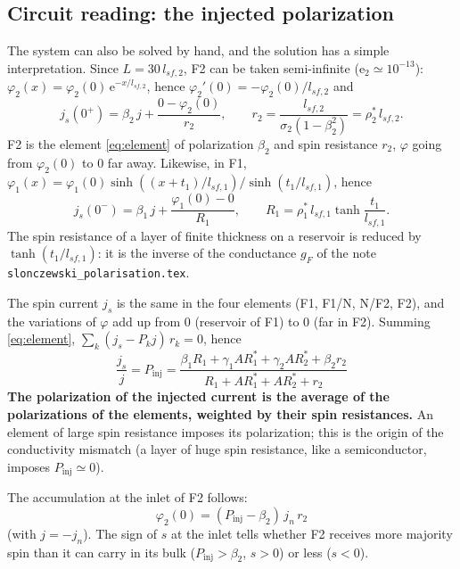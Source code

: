 \documentclass[11pt,a4paper]{article}
\newcommand{\ee}{\mathrm{e}}
\begin{document}
\subsection{Circuit reading: the injected polarization}
\label{sec:circuit}

The system can also be solved by hand, and the solution has a simple
interpretation. Since $L = 30\,l_{sf,2}$, F2 can be taken semi-infinite
($\ee_2 \simeq 10^{-13}$): $\varphi_2(x) = \varphi_2(0)\,\ee^{-x/l_{sf,2}}$,
hence $\varphi_2'(0) = -\varphi_2(0)/l_{sf,2}$ and
\begin{equation}
  j_s(0^+) = \beta_2\,j + \frac{0-\varphi_2(0)}{r_2},
  \qquad r_2 = \frac{l_{sf,2}}{\sigma_2(1-\beta_2^2)} = \rho_2^*\,l_{sf,2} .
\end{equation}
F2 is the element \eqref{eq:element} of polarization $\beta_2$ and spin
resistance $r_2$, $\varphi$ going from $\varphi_2(0)$ to 0 far away.
Likewise, in F1, $\varphi_1(x) = \varphi_1(0)\sinh\left((x+t_1)/l_{sf,1}\right)/
\sinh(t_1/l_{sf,1})$, hence
\begin{equation}
  j_s(0^-) = \beta_1\,j + \frac{\varphi_1(0)-0}{R_1},
  \qquad R_1 = \rho_1^*\,l_{sf,1}\tanh\frac{t_1}{l_{sf,1}} .
\end{equation}
The spin resistance of a layer of finite thickness on a reservoir is
reduced by $\tanh(t_1/l_{sf,1})$: it is the inverse of the conductance
$g_F$ of the note \texttt{slonczewski\_polarisation.tex}.

The spin current $j_s$ is the same in the four elements (F1, F1/N, N/F2,
F2), and the variations of $\varphi$ add up from 0 (reservoir of F1) to 0
(far in F2). Summing \eqref{eq:element},
$\sum_k (j_s - P_kj)\,r_k = 0$, hence
\begin{equation}
  \boxed{\;\frac{j_s}{j} = P_{\mathrm{inj}}
  = \frac{\beta_1R_1 + \gamma_1AR_1^* + \gamma_2AR_2^* + \beta_2r_2}
         {R_1 + AR_1^* + AR_2^* + r_2}\;}
  \label{eq:Pinj}
\end{equation}
\textbf{The polarization of the injected current is the average of the
polarizations of the elements, weighted by their spin resistances.} An
element of large spin resistance imposes its polarization; this is the
origin of the conductivity mismatch (a layer of huge spin resistance, like
a semiconductor, imposes $P_{\mathrm{inj}}\simeq0$).

The accumulation at the inlet of F2 follows:
\begin{equation}
  \boxed{\;\varphi_2(0) = (P_{\mathrm{inj}}-\beta_2)\,j_n\,r_2\;}
  \label{eq:phi0}
\end{equation}
(with $j = -j_n$). The sign of $s$ at the inlet tells whether F2 receives
more majority spin than it can carry in its bulk ($P_{\mathrm{inj}} >
\beta_2$, $s>0$) or less ($s<0$).
\end{document}
